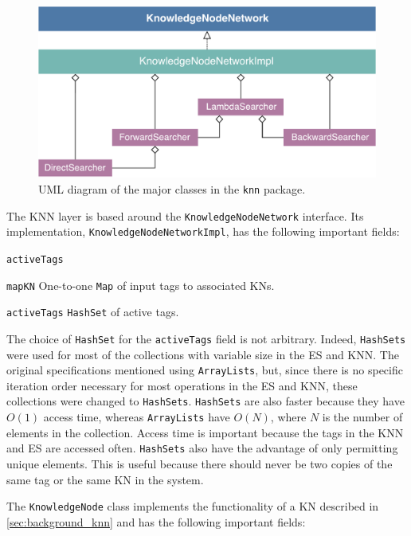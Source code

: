 \documentclass[titlepage,11pt]{article}
\newcommand{\code}[1]{\texttt{#1}}
\begin{document}
\begin{figure}[!htb]
	\includegraphics[width=\columnwidth]{figures/uml_knn.pdf}
	\caption{UML diagram of the major classes in the \code{knn} package.}
	\label{fig:uml_knn}
\end{figure}

The KNN layer is based around the \code{KnowledgeNodeNetwork} interface. Its implementation, \code{KnowledgeNodeNetworkImpl}, has the following important fields:

\begin{labeling}{\code{activeTags}}
	\item[\code{mapKN}] One-to-one \code{Map} of input tags to associated KNs.
	\item[\code{activeTags}] \code{HashSet} of active tags.
\end{labeling}

The choice of \code{HashSet} for the \code{activeTags} field is not arbitrary. Indeed, \code{HashSets} were used for most of the collections with variable size in the ES and KNN. The original specifications mentioned using \code{ArrayLists}, but, since there is no specific iteration order necessary for most operations in the ES and KNN, these collections were changed to \code{HashSets}. \code{HashSets} are also faster because they have $O(1)$ access time, whereas \code{ArrayLists} have $O(N)$, where $N$ is the number of elements in the collection. Access time is important because the tags in the KNN and ES are accessed often. \code{HashSets} also have the advantage of only permitting unique elements. This is useful because there should never be two copies of the same tag or the same KN in the system.

The \code{KnowledgeNode} class implements the functionality of a KN described in \cref{sec:background_knn} and has the following important fields:
\end{document}
